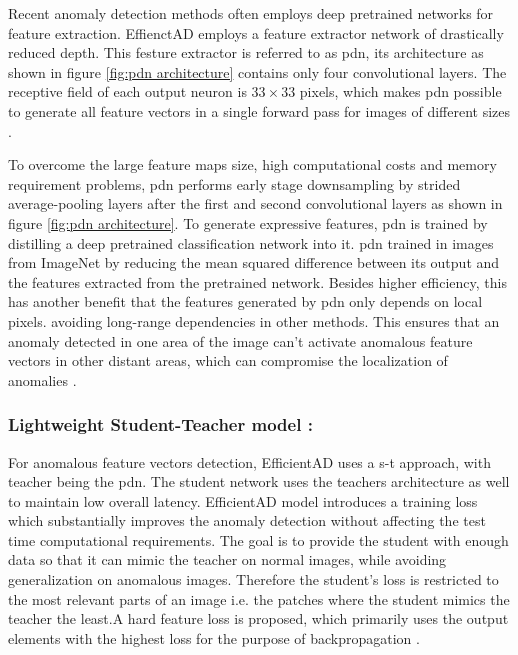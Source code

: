 Recent anomaly detection methods often employs deep pretrained networks for feature extraction. EffienctAD employs a feature extractor network of drastically reduced depth. This festure extractor is referred to as \gls{pdn}, its architecture as shown in figure \ref{fig:pdn architecture} contains only four convolutional layers. The receptive field of each output neuron is $33\times33$ pixels, which makes \gls{pdn} possible to generate all feature vectors in a single forward pass for images of different sizes \cite{batzner2024efficientadaccuratevisualanomaly}.

To overcome the large feature maps size, high computational costs and memory requirement problems, \gls{pdn} performs early stage downsampling by strided average-pooling layers after the first and second convolutional layers as shown in figure \ref{fig:pdn architecture}. To generate expressive features, \gls{pdn} is trained by distilling a deep pretrained classification network into it. \gls{pdn} trained in images from ImageNet by reducing the mean squared difference between its output and the features extracted from the pretrained network. Besides higher efficiency, this has another benefit that the features generated by \gls{pdn} only depends on local pixels. avoiding long-range dependencies in other methods. This ensures that an anomaly detected in one area of the image can't activate anomalous feature vectors in other distant areas, which can compromise the localization of anomalies \cite{batzner2024efficientadaccuratevisualanomaly}.

\subsubsection*{Lightweight Student-Teacher model :}

For anomalous feature vectors detection, EfficientAD uses a \gls{s-t} approach, with teacher being the \gls{pdn}. The student network uses the teachers architecture as well to maintain low overall latency. EfficientAD model introduces a training loss  which substantially improves the anomaly detection without affecting the test time computational requirements. The goal is to provide the student with enough data so that it can mimic the teacher on normal images, while avoiding generalization on anomalous images. Therefore the student's loss is restricted to the most relevant parts of an image i.e. the patches where the student mimics the teacher the least.A hard feature loss is proposed, which primarily uses the output elements with the highest loss for the purpose of backpropagation \cite{batzner2024efficientadaccuratevisualanomaly}.

